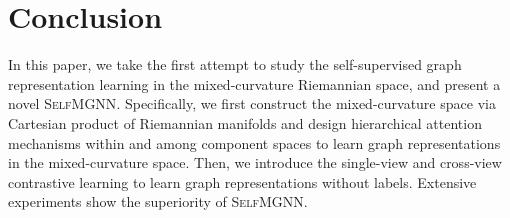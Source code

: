 \section{Conclusion}

In this paper, we take the first attempt to study the self-supervised graph representation learning in the mixed-curvature Riemannian space, and present a novel \textsc{SelfMGNN}.
Specifically, we first construct the mixed-curvature space via Cartesian product  of Riemannian manifolds
and design hierarchical attention mechanisms within and among component spaces to learn graph representations in the mixed-curvature space.
Then, we introduce the
single-view
and cross-view contrastive learning to learn graph representations without labels.
Extensive experiments show the superiority of \textsc{SelfMGNN}.

      

